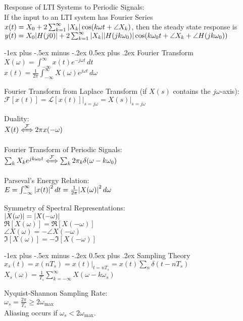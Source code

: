\documentclass[12pt,landscape]{article}
\makeatletter
\renewcommand{\section}{\@startsection{section}{1}{0mm}%
                                {-1ex plus -.5ex minus -.2ex}%
                                {0.5ex plus .2ex}%
                                {\normalfont\normalsize\bfseries}}
\newcommand{\tab}{\hspace{.02\textwidth}}
\newcommand{\ds}{\displaystyle}
\makeatother
\begin{document}
\begin{multicols*}{3}
Response of LTI Systems to Periodic Signals:\\
\tab If the input to an LTI system has Fourier Series $x(t) = X_0 + 2\sum_{k=1}^{\infty}\abs{X_k}\cos(k\omega t + \angle X_k)$, then the steady state response is $y(t) = X_0\abs{H(j0)} + 2\sum_{k=1}^{\infty}\abs{X_k}\abs{H(jk\omega_0)}\cos(k\omega_0 t + \angle X_k + \angle H(jk\omega_0))$

\section{Fourier Transform}
\tab $X(\omega) = \int_{-\infty}^{\infty}x(t)e^{-j\omega t}\,dt$\\
\tab $x(t) = \frac{1}{2\pi}\int_{-\infty}^{\infty}X(\omega)e^{j\omega t}\,d\omega$

Fourier Transform from Laplace Transform (if $X(s)$ contains the $j\omega$-axis):\\
\tab $\mathcal{F}[x(t)] = \mathcal{L}[x(t)]\big\rvert_{s = j\omega} = X(s)\big\rvert_{s = j\omega}$

Duality:\\
\tab $\ds X(t) \xLeftrightarrow{\mathcal{F}} 2\pi x(-\omega)$

Fourier Transform of Periodic Signals:\\
\tab $\sum_k X_k e^{jk\omega_0 t} \xLeftrightarrow{\mathcal{F}} \sum_k 2\pi_k \delta(\omega - k\omega_0)$

Parseval's Energy Relation:\\
\tab $E = \int_{-\infty}^{\infty} \abs{x(t)}^2\,dt = \frac{1}{2\pi}\abs{X(\omega)}^2\,d\omega$

Symmetry of Spectral Representations:\\
\tab $\abs{X(\omega)} = \abs{X(-\omega)}$\\
\tab $\Re[X(\omega)] = \Re[X(-\omega)]$\\
\tab $\angle X(\omega) = -\angle X(-\omega)$\\
\tab $\Im[X(\omega)] = -\Im[X(-\omega)]$

\section{Sampling Theory}
\tab $x_s(t) = x(nT_s) = x(t)\rvert_{t = nT_s} = x(t)\sum_n \delta(t - nT_s)$\\
\tab $X_s(\omega) = \frac{1}{T_s} \sum_{k=-\infty}^{\infty}X(\omega - k\omega_s)$

Nyquist-Shannon Sampling Rate:\\
\tab $\omega_s = \frac{2\pi}{T_s} \geq 2\omega_\text{max}$\\
\tab Aliasing occurs if $\omega_s < 2\omega_\text{max}$.


\end{multicols*}
\end{document}

